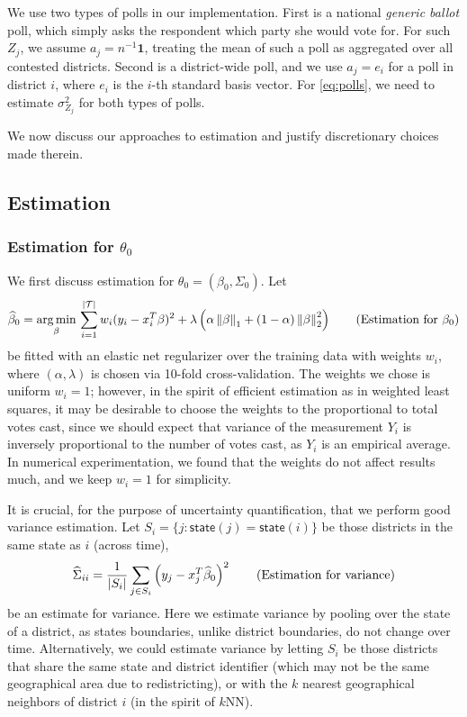 \documentclass[12pt, letterpaper]{article}
\begin{document}
We use two types of polls in our implementation. First is a national
\emph{generic ballot} poll, which simply asks the respondent which party she
would vote for. For such $Z_j$, we assume $a_j = n^{-1} \bm 1$, treating the
mean of such a poll as aggregated over all contested districts. Second is a
district-wide poll, and we use $a_j = e_i$ for a poll in district $i$, where
$e_i$ is the $i$-th standard basis vector. For \eqref{eq:polls}, we need to
estimate $\sigma_{Z_j}^2$ for both types of polls.

We now discuss our approaches to estimation and justify discretionary choices
made therein. 

\subsection{Estimation}
\label{sec:estimate}
\subsubsection{Estimation for $\theta_0$}
We first discuss estimation for $\theta_0 = (\beta_0, \Sigma_0)$.
Let \begin{equation}
\widehat \beta_0 = \operatorname*{arg\,min}_\beta \, \sum_{i=1}^{|\mathcal T|} w_i (y_i - x_i^T
\beta)^2
+ \lambda
\left({\alpha \left\lVert\beta\right\rVert_1 + (1-\alpha) \left\lVert\beta\right\rVert_2^2}\right)
\tag{Estimation for $\beta_0$}
\label{eq:beta}
\end{equation}
be fitted with an elastic net regularizer over the training data with weights
$w_i$,
where
$(\alpha, \lambda)$ is chosen via 10-fold cross-validation. The weights we chose is uniform $w_i = 1$; however, in the spirit of efficient
estimation as in weighted least
squares, it may be desirable to choose the weights to the proportional to total
votes cast, since we should expect that variance of the measurement $Y_i$ is
inversely proportional to the number of votes cast, as $Y_i$ is an empirical
average. In numerical experimentation, we found that the weights do not affect
results much, and we keep $w_i = 1$ for simplicity.

It is crucial, for the purpose of uncertainty quantification, that we perform good variance estimation. Let $S_i = \{j: \mathsf{state}(j) = 
\mathsf{state}(i)\}$ be those districts in the same state as $i$ (across time),
\[
\widehat \Sigma_{ii} = \frac{1}{|S_i|} \sum_{j\in S_i}
\left({y_j
- x_j^T \widehat \beta_0}\right)^2 \tag{Estimation for variance}
\label{eq:var}
\]
be an estimate for variance. Here we estimate variance by pooling over the state
of a district, as states boundaries, unlike district boundaries, do not change
over time. Alternatively, we could estimate variance by letting $S_i$ be those
districts that share the same state and district identifier (which may not be
the same geographical area due to redistricting), or with the $k$ nearest geographical neighbors of district $i$ (in the spirit of $k$NN). 
\end{document}
